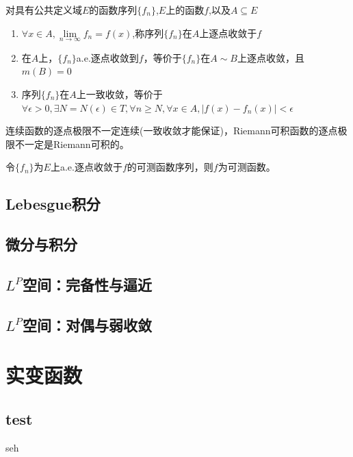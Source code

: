 \documentclass[12pt, a4paper, oneside, UTF8]{ctexbook}
\begin{document}
\begin{defn}
	对具有公共定义域$E$的函数序列$\{f_n\}$,$E$上的函数$f$,以及$A\subseteq E$
	\begin{enumerate}[label=\Roman*]
		\item $\forall x\in A,\lim\limits_{n \to \infty} f_n = f(x)$,称序列$\{f_n\}$在$A$上逐点收敛于$f$
		\item 在$A$上，$\{f_n\}$a.e.逐点收敛到$f$，等价于$\{f_n\}$在$A\sim B$上逐点收敛，且$m(B)=0$
		\item 序列$\{f_n\}$在$A$上一致收敛，等价于$\forall \epsilon >0,\exists N=N(\epsilon) \in T,\forall n\geq N,\forall x\in A,|f(x)-f_n(x)|<\epsilon$
	\end{enumerate}
\end{defn}
	连续函数的逐点极限不一定连续(一致收敛才能保证)，Riemann可积函数的逐点极限不一定是Riemann可积的。
	
\begin{proposition}
	令$\{f_n\}$为$E$上a.e.逐点收敛于$f$的可测函数序列，则$f$为可测函数。
\end{proposition}


\section{Lebesgue积分}



\section{微分与积分}

\section{$L^P$空间：完备性与逼近}



\section{$L^P$空间：对偶与弱收敛}
\chapter{实变函数}
\section{test}
seh
\ifx\allfiles\undefined
\end{document}
